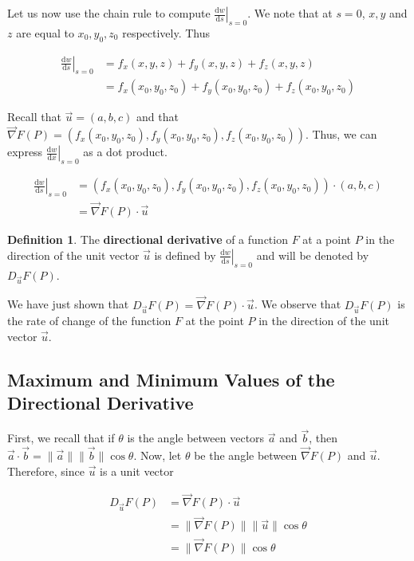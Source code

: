 \documentclass[11pt]{article}
\theoremstyle{plain} %
\theoremstyle{definition}
\newtheorem*{definition}{Definition} %
\theoremstyle{example}
\theoremstyle{remark}
\begin{document}
Let us now use the chain rule to compute $\left.\frac{\mathrm d w}{\mathrm d s}\right|_{s = 0}$. We note that at $s=0$, $x, y$ and $z$ are equal to $x_0, y_0, z_0$ respectively. Thus

\begin{align*}
	\left.\frac{\mathrm d w}{\mathrm d s}\right|_{s=0} &= f_x(x, y, z)+f_y(x, y, z) + f_z(x, y, z)\\
	&= f_x(x_0, y_0, z_0) + f_y(x_0, y_0, z_0) + f_z(x_0, y_0, z_0)
\end{align*}

Recall that $\vec{u} = (a, b, c)$ and that $\vec{\nabla}F(P) = (f_x(x_0, y_0, z_0), f_y(x_0, y_0, z_0) ,f_z(x_0, y_0, z_0))$. Thus, we can express $\left.\frac{\mathrm d w}{\mathrm d x}\right|_{s=0}$ as a dot product. 

\begin{align*}
	\left.\frac{\mathrm d w}{\mathrm d s}\right|_{s=0} &= (f_x(x_0, y_0, z_0),f_y(x_0, y_0, z_0) , f_z(x_0, y_0, z_0))\cdot (a, b, c)\\
	&= \vec{\nabla}F(P)\cdot \vec{u}
\end{align*}

\begin{definition}
The \textbf{directional derivative} of a function $F$ at a point $P$ in the direction of the unit vector $\vec{u}$ is defined by  $\left.\frac{\mathrm d w}{\mathrm d s}\right|_{s=0}$ and will be denoted by $D_{\vec{u}}F(P)$.
\end{definition}

We have just shown that $D_{\vec{u}}F(P) = \vec{\nabla}F(P)\cdot \vec{u}$. We observe that $D_{\vec{u}}F(P)$ is the rate of change of the function $F$ at the point $P$ in the direction of the unit vector $\vec{u}$. 

\subsection{Maximum and Minimum Values of the Directional Derivative}

First, we recall that if $\theta$ is the angle between vectors $\vec{a}$ and $\vec{b}$, then $\vec{a} \cdot \vec{b} = \|\vec{a}\|\|\vec{b}\|\cos\theta$. Now, let $\theta$ be the angle between $\vec{\nabla}F(P)$ and $\vec{u}$. Therefore, since $\vec{u}$ is a unit vector 

\begin{align*}
	D_{\vec{u}}F(P) &= \vec{\nabla}F(P)\cdot \vec{u}\\
	&= \|\vec{\nabla}F(P)\|\|\vec{u}\|\cos\theta\\
	&= \|\vec{\nabla}F(P)\|\cos\theta 
\end{align*}
\end{document}
